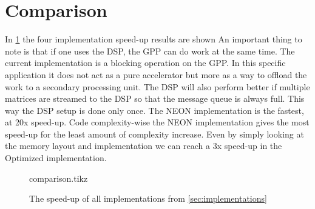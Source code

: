 \documentclass[final]{article}
\begin{document}
\section{Comparison}
\label{sec:comparison}
In \cref{fig:comparison} the four implementation speed-up results are shown
An important thing to note is that if one uses the DSP, the GPP can do work at the same time.
The current implementation is a blocking operation on the GPP.
In this specific application it does not act as a pure accelerator but more as a way to offload the work to a secondary processing unit.
The DSP will also perform better if multiple matrices are streamed to the DSP so that the message queue is always full.
This way the DSP setup is done only once.
The NEON implementation is the fastest, at 20x speed-up. %
Code complexity-wise the NEON implementation gives the most speed-up for the least amount of complexity increase.
Even by simply looking at the memory layout and implementation we can reach a 3x speed-up in the Optimized implementation.

\begin{figure}
\centering
\setlength\figureheight{8cm}
\setlength\figurewidth{\linewidth}
{comparison.tikz}
\caption{The speed-up of all implementations from \cref{sec:implementations}}
\label{fig:comparison}
\end{figure}
\end{document}
